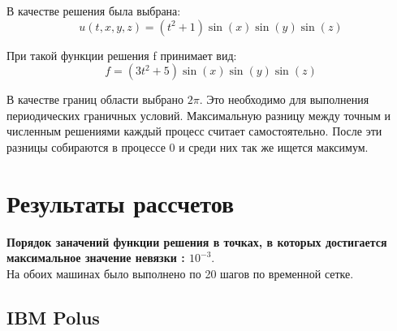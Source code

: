 \documentclass[12pt]{article}
\begin{document}
	В качестве решения была выбрана:
	$$u(t, x, y, z) = (t^2 + 1)\sin(x)\sin(y)\sin(z)$$
	
	При такой функции решения f принимает вид:
	$$f = (3t^2 + 5)\sin(x)\sin(y)\sin(z)$$
	
	В качестве границ области выбрано $2\pi$. Это необходимо для выполнения периодических граничных условий.
	Максимальную разницу между точным и численным решениями каждый процесс считает самостоятельно. После эти разницы собираются в процессе 0 и среди них так же ищется максимум.
	
	\newpage
	\section{Результаты рассчетов}
	
	\textbf{Порядок заначений функции решения в точках, в которых достигается максимальное значение невязки : $10^{-3}$}.\\
	\noindent
	На обоих машинах было выполнено по 20 шагов по временной сетке.
	
	
	\subsection{IBM Polus}
	
	\begin{table}[!h]
		\begin{minipage}{1\linewidth}
			\centering
		\end{minipage}%
		\caption{Результаты экспериментов IBM Polus}
		\label{table:polus}
	\end{table} 
\end{document}
